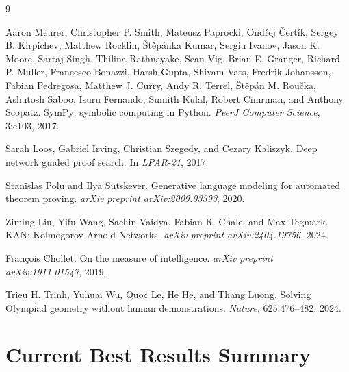 \documentclass[11pt]{article}
\begin{document}
\FloatBarrier
\clearpage
\begin{thebibliography}{9}

Aaron Meurer, Christopher P. Smith, Mateusz Paprocki, Ond\v{r}ej \v{C}ert\'{i}k, Sergey B. Kirpichev, Matthew Rocklin, \v{S}t\v{e}p\'{a}nka Kumar, Sergiu Ivanov, Jason K. Moore, Sartaj Singh, Thilina Rathnayake, Sean Vig, Brian E. Granger, Richard P. Muller, Francesco Bonazzi, Harsh Gupta, Shivam Vats, Fredrik Johansson, Fabian Pedregosa, Matthew J. Curry, Andy R. Terrel, \v{S}t\v{e}p\'{a}n M. Rou\v{c}ka, Ashutosh Saboo, Isuru Fernando, Sumith Kulal, Robert Cimrman, and Anthony Scopatz.
\newblock SymPy: symbolic computing in Python.
\newblock \emph{PeerJ Computer Science}, 3:e103, 2017.

Sarah Loos, Gabriel Irving, Christian Szegedy, and Cezary Kaliszyk.
\newblock Deep network guided proof search.
\newblock In \emph{LPAR-21}, 2017.

Stanislas Polu and Ilya Sutskever.
\newblock Generative language modeling for automated theorem proving.
\newblock \emph{arXiv preprint arXiv:2009.03393}, 2020.

Ziming Liu, Yifu Wang, Sachin Vaidya, Fabian R. Chale, and Max Tegmark.
\newblock KAN: Kolmogorov-Arnold Networks.
\newblock \emph{arXiv preprint arXiv:2404.19756}, 2024.

Fran\c{c}ois Chollet.
\newblock On the measure of intelligence.
\newblock \emph{arXiv preprint arXiv:1911.01547}, 2019.

Trieu H. Trinh, Yuhuai Wu, Quoc Le, He He, and Thang Luong.
\newblock Solving Olympiad geometry without human demonstrations.
\newblock \emph{Nature}, 625:476--482, 2024.

\end{thebibliography}

\clearpage

\appendix
\section{Current Best Results Summary}
\end{document}
